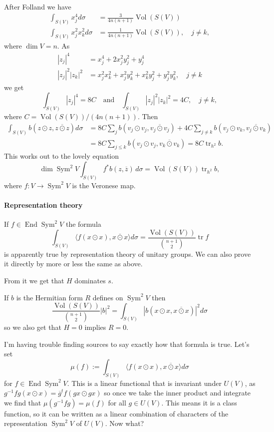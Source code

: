 \documentclass[11pt]{article}
\theoremstyle{definition}
\def\qandq{\quad\text{and}\quad}
\def\ov#1{\overline{#1}}
\DeclareMathOperator{\Vol}{Vol}
\DeclareMathOperator{\End}{End}
\DeclareMathOperator{\Sym}{Sym}
\DeclareMathOperator{\tr}{tr}
\begin{document}
After Folland we have
\begin{align*}
\int_{S(V)} x_j^4 d\sigma &= \frac{3}{4n(n+1)} \Vol(S(V))
\\
\int_{S(V)} x_j^2 x_k^2 d\sigma &= \frac{1}{4n(n+1)} \Vol(S(V)),
\quad j \not= k,
\end{align*}
where $\dim V = n$.
As
\begin{align*}
|z_j|^4 &= x_j^4 + 2 x_j^2 y_j^2 + y_j^4
\\
|z_j|^2 |z_k|^2 &= x_j^2 x_k^2 + x_j^2 y_k^2 + x_k^2 y_j^2 + y_j^2 y_k^2,
\quad
j \not= k
\end{align*}
we get
$$
\int_{S(V)} |z_j|^4 = 8 C
\qandq
\int_{S(V)} |z_j|^2 |z_k|^2 = 4 C,
\quad j\not=k,
$$
where $C = \Vol(S(V)) / (4n(n+1))$.
Then
\begin{align*}
\int_{S(V)}
\!\!\!
b(z \odot z, \ov{z \odot z}) d\sigma
&= 8C \sum_{j} b(v_j {\odot} v_j, \ov{v_j {\odot} v_j})
+ 4C \sum_{j\not=k} b(v_j {\odot} v_k, \ov{v_j {\odot} v_k})
\\
&= 8C \sum_{j \leq k} b(v_j {\odot} v_j, \ov{v_k {\odot} v_k})
= 8C \tr_{h^2} b.
\end{align*}
This works out to the lovely equation
$$
\dim{\Sym^2 V} \int_{S(V)} \!\! f^*b(z, \ov z) \, d\sigma
= \Vol(S(V)) \tr_{h^2} b,
$$
where $f : V \to \Sym^2 V$ is the Veronese map.


\paragraph{Representation theory}

If $f \in \End \Sym^2 V$ the formula
$$
\int_{S(V)} \langle f(x \odot x), \ov{x \odot x} \rangle d\sigma
= \frac{\Vol(S(V))}{\binom{n+1}{2}} \tr f
$$
is apparently true by representation theory of unitary groups.
We can also prove it directly by more or less the same as above.


From it we get that $H$ dominates $s$.

If $b$ is the Hermitian form $R$ defines on $\Sym^2 V$ then
$$
\frac{\Vol(S(V))}{\binom{n+1}{2}} |b|^2
= \int_{S(V)} |b(x \odot x, \ov{x \odot x})|^2 d\sigma
$$
so we also get that $H = 0$ implies $R = 0$.

I'm having trouble finding sources to say exactly how that formula is true.
Let's set
$$
\mu(f) := \int_{S(V)} \langle f(x \odot x), \ov{x \odot x} \rangle d\sigma
$$
for $f \in \End \Sym^2 V$.
This is a linear functional that is invariant under $U(V)$, as
$g^{-1} f g (x \odot x) = \ov g^t f (gx \odot gx)$
so once we take the inner product and integrate we find that $\mu(g^{-1}fg) =
\mu(f)$ for all $g \in U(V)$.
This means it is a class function, so it can be written as a linear combination
of characters of the representation $\Sym^2 V$ of $U(V)$.
Now what?
\end{document}
